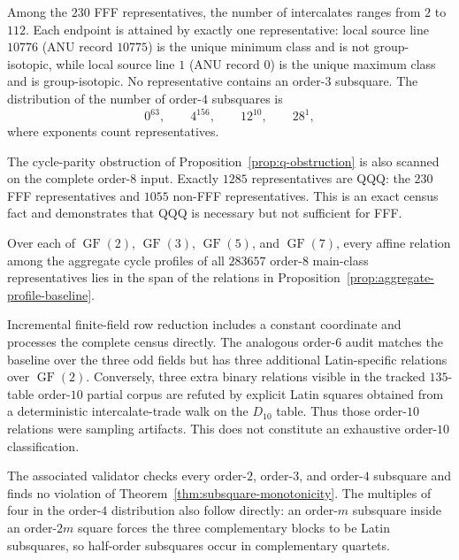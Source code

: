 \begin{computationaltheorem}
Among the $230$ FFF representatives, the number of intercalates ranges from
$2$ to $112$.  Each endpoint is attained by exactly one representative: local
source line $10776$ (ANU record $10775$) is the unique minimum class and is not
group-isotopic, while local source line $1$ (ANU record $0$) is the unique
maximum class and is group-isotopic.  No representative
contains an order-$3$ subsquare.  The distribution of the number of
order-$4$ subsquares is
\[
  0^{63},\qquad 4^{156},\qquad 12^{10},\qquad 28^1,
\]
where exponents count representatives.
\end{computationaltheorem}

The cycle-parity obstruction of Proposition~\ref{prop:q-obstruction} is also
scanned on the complete order-$8$ input.  Exactly $1285$ representatives are
QQQ: the $230$ FFF representatives and $1055$ non-FFF representatives.  This
is an exact census fact and demonstrates that QQQ is necessary but not
sufficient for FFF.

\begin{computationaltheorem}
\label{cthm:affine-profile-saturation}
Over each of $\operatorname{GF}(2)$, $\operatorname{GF}(3)$,
$\operatorname{GF}(5)$, and $\operatorname{GF}(7)$, every affine relation
among the aggregate cycle profiles of all $283657$ order-$8$ main-class
representatives lies in the span of the relations in
Proposition~\ref{prop:aggregate-profile-baseline}.
\end{computationaltheorem}

Incremental finite-field row reduction includes a constant coordinate and
processes the complete census directly.  The analogous order-$6$ audit
matches the baseline over the three odd fields but has three additional
Latin-specific relations over $\operatorname{GF}(2)$.  Conversely, three
extra binary relations visible in the tracked $135$-table order-$10$ partial
corpus are refuted by explicit Latin squares obtained from a deterministic
intercalate-trade walk on the $D_{10}$ table.  Thus those order-$10$
relations were sampling artifacts.  This does not constitute an exhaustive
order-$10$ classification.

The associated validator checks every order-$2$, order-$3$, and order-$4$
subsquare and finds no violation of
Theorem~\ref{thm:subsquare-monotonicity}.  The multiples of four in the
order-$4$ distribution also follow directly: an order-$m$ subsquare inside
an order-$2m$ square forces the three complementary blocks to be Latin
subsquares, so half-order subsquares occur in complementary quartets.

